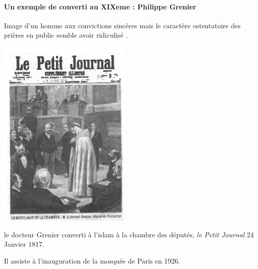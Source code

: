 \paragraph{Un exemple de converti au XIXeme : Philippe Grenier}
Image d'un homme aux convictions sincères mais le caractère ostentatoire des prières en public semble avoir ridiculisé .
\begin{marginfigure}
    \centering
    \includegraphics[width=\textwidth]{Images/DocteurGrenier.png}
    \caption{le docteur Grenier converti à l'islam à la chambre des députés, \textit{le Petit Journal} 24 Janvier 1817.}
    \label{fig:DocteurGrenier}
\end{marginfigure}
Il assiste à l'inauguration de la mosquée de Paris en 1926.

